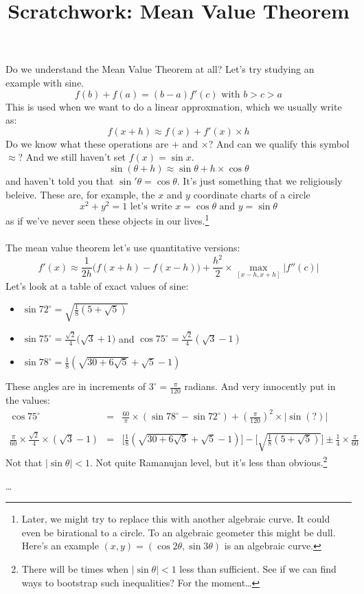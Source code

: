 \documentclass[12pt]{article}
\title{Scratchwork: Mean Value Theorem}
\date{}
\begin{document}

\sffamily

\maketitle

\noindent Do we understand the Mean Value Theorem at all? Let's try studying an example with sine. 
$$ f(b) + f(a) = (b-a)f'(c) \text{ with } b > c > a $$
This is used when we want to do a linear approxmation, which we usually write as:
$$ f(x+h) \approx f(x) + f'(x)\times h$$
Do we know what these operations are $+$ and $\times$?  And can we qualify this symbol $\approx$? And we still haven't set $f(x) = \sin x$.
$$ \sin (\theta +h) \approx \sin \theta + h \times \cos \theta $$
and haven't told you that $\sin'\theta = \cos \theta$.  It's just something that we religiously beleive.  These are, for example, the $x$ and $y$ coordinate charts of a circle
$$ x^2 + y^2 = 1 \text{ let's write } x = \cos \theta \text{ and } y = \sin \theta $$
as if we've never seen these objects in our lives.\footnote{Later, we might try to replace this with another algebraic curve.  It could even be birational to a circle.  To an algebraic geometer this might be dull.  Here's an example $(x,y) = (\cos 2\theta, \sin 3\theta)$ is an algebraic curve.} \\ \\
The mean value theorem let's use quantitative versions:
$$ f'(x) \approx \frac{1}{2h}\big( f(x+h) - f(x-h) \big) + \frac{h^2}{2} \times \max_{[x-h , x+h]} |f''(c)|$$
Let's look at a table of exact values of sine:
\begin{itemize}
\item $ \sin 72^\circ = \sqrt{\frac{1}{8}(5 + \sqrt{5})}$
\item $ \sin 75^\circ = \frac{\sqrt{2}}{4} \big( \sqrt{3}+1 \big)$ and $ \cos 75^\circ = \frac{\sqrt{2}}{4} (\sqrt{3}-1) $
\item $ \sin 78^\circ = \frac{1}{8}(\sqrt{30 + 6 \sqrt{5}} + \sqrt{5}-1)$
\end{itemize}
These angles are in increments of $3^\circ  = \frac{\pi}{120}$ radians.  And very innocently put in the values:
\begin{eqnarray*}
\cos 75^\circ &=& \frac{60}{\pi}\times (\sin 78^\circ - \sin 72^\circ) + (\frac{\pi}{120})^2 \times |\sin(?)| \\ \\
\frac{\pi}{60} \times \frac{\sqrt{2}}{4} \times (\sqrt{3}-1) &=&   \Big[\frac{1}{8}(\sqrt{30 + 6 \sqrt{5}} + \sqrt{5}-1)\Big]
- \Big[\sqrt{\frac{1}{8}(5 + \sqrt{5})}\Big]  \pm \frac{1}{4} \times \frac{\pi}{60}
\end{eqnarray*}
Not that $|\sin \theta| < 1$. Not quite Ramanujan level, but it's less than obvious.\footnote{There will be times when $|\sin \theta| < 1$ less than sufficient.  See if we can find ways to bootstrap such inequalities?  For the moment\dots}
\begin{thebibliography}{}

\item \dots

\end{thebibliography}
\end{document}
